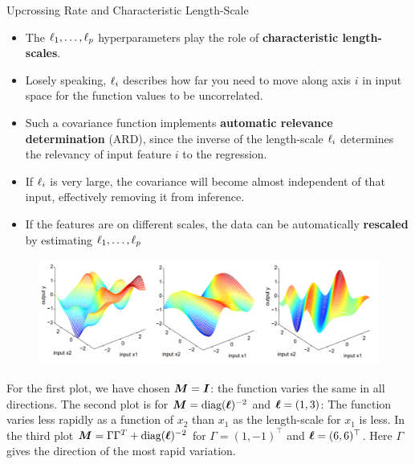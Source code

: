 \begin{frame}[c,allowframebreaks]{Upcrossing Rate and Characteristic Length-Scale}
\begin{itemize} 
\item The $\ell_1,\dots, \ell_p$ hyperparameters play the role of \textbf{characteristic length-scales}.
\vspace{2mm}
\item Losely speaking, $\ell_i$ describes how far you need to move along axis $i$ in input space for the function values to be uncorrelated.
\vspace{2mm}
\item Such a covariance function implements \textbf{automatic relevance determination} (ARD), since the inverse of the length-scale $\ell_i$ determines the relevancy of input feature $i$ to the regression.
\vspace{2mm}
\item If $\ell_i$ is very large, the covariance will become almost independent of that input, effectively removing it from inference.
\vspace{2mm}
\item If the features are on different scales, the data can be automatically \textbf{rescaled} by estimating $\ell_1,\dots, \ell_p$ 

\end{itemize}



\framebreak


\begin{figure}
	\includegraphics[width = .8\textwidth]{figure_man/covariance2D.png}
\end{figure}

\vspace{3mm}
For the first plot, we have chosen $\bm{M} = \boldsymbol{I}$: the function varies the same in all directions. The second plot is for $\bm{M} = \text{diag}(\bm{\ell})^{-2}$ and $\bm{\ell} = \left(1, 3 \right)$: The function varies less rapidly as a function of $x_2$ than $x_1$ as the length-scale for $x_1$ is less. In the third plot $\bm{M} = \Gamma \Gamma^T + \text{diag}(\bm{\ell})^{-2}$ for $\Gamma = (1, -1)^\top$ and $\bm{\ell} = (6, 6)^\top$. Here $\Gamma$ gives the direction of the most rapid variation. %


\end{frame}


